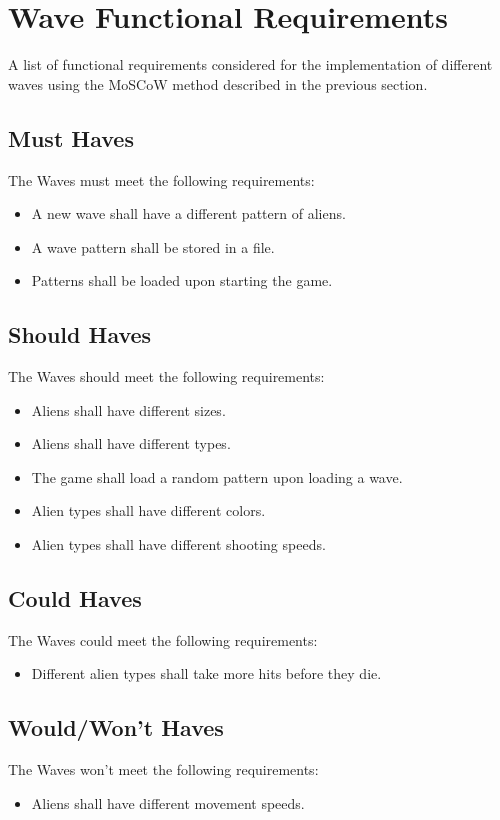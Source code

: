 \section{Wave Functional Requirements}

A list of functional requirements considered for the implementation of different waves using the MoSCoW method described in the previous section.

\subsection{Must Haves}
The Waves must meet the following requirements:
\begin{itemize}
	\item A new wave shall have a different pattern of aliens.
	\item A wave pattern shall be stored in a file.
	\item Patterns shall be loaded upon starting the game.
\end{itemize}

\subsection{Should Haves}
The Waves should meet the following requirements:
\begin{itemize}
	\item Aliens shall have different sizes.
	\item Aliens shall have different types.
	\item The game shall load a random pattern upon loading a wave.
	\item Alien types shall have different colors.
	\item Alien types shall have different shooting speeds.
\end{itemize}

\subsection{Could Haves}
The Waves could meet the following requirements:
\begin{itemize}
	\item Different alien types shall take more hits before they die.
\end{itemize}

\subsection{Would/Won't Haves}
The Waves won't meet the following requirements:
\begin{itemize}
	\item Aliens shall have different movement speeds.
\end{itemize}
